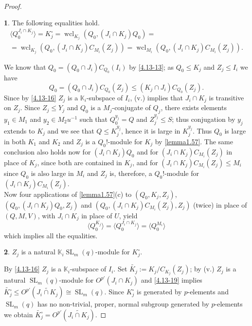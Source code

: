 \documentclass{amsart}
\numberwithin{equation}{section}
\theoremstyle{definition}
\theoremstyle{subresult}
\newtheorem{subresult}{}[equation]
\theoremstyle{caseresult}
\newcommand{\bK}{\mathbb{K}}
\newcommand{\SL}{\operatorname{SL}}
\newcommand{\wcl}{\operatorname{wcl}}
\newcommand{\inv}{^{-1}}
\newcommand{\<}{\langle}
\renewcommand{\>}{\rangle}
\begin{document}
\begin{proof}
	\begin{subresult}\label{4.13-19}
		The following equalities hold.
		\begin{multline*}
			\< Q_0^{J_i \cap K_j} \> = K_j^\circ = \wcl_{K_j}(Q_0,(J_i \cap K_j)Q_0) = \\
			= \wcl_{K_j}(Q_0,(J_i \cap K_j)C_{M_i}(Z_j)) = \wcl_{M_i}(Q_0,(J_i \cap K_j)C_{M_i}(Z_j)) .
		\end{multline*}
	\end{subresult}
	We know that $Q_0 = (Q_0 \cap J_i)C_{Q_0}(I_i)$ by \eqref{4.13-13}; as $Q_0 \le K_j$ and $Z_j \le I_i$ we have
	\[
	Q_0 = (Q_0 \cap J_i)C_{Q_0}(Z_j) \le (K_j \cap J_i)C_{Q_0}(Z_j).
	\]
	Since by \eqref{4.13-16} $Z_j$ is a $\bK_i$-subspace of $I_i$, (v.) implies that $J_i \cap K_j$ is transitive on $Z_j$. Since $Z_j \le Y_j$ and $Q_0$ is a $M_j$-conjugate of $Q_j$, there exists elements $y_1 \in M_1$ and $y_2 \in M_2u\inv$ such that $Q_0^{y_j}=Q$ and $Z_j^{y_j} \le S$; thus conjugation by $y_j$ extends to $K_j$ and we see that $Q \le K_j^{y_j}$, hence it is large in $K_j^{y_j}$. Thus $Q_0$ is large in both $K_1$ and $K_2$ and $Z_j$ is a $Q_0!$-module for $K_j$ by \ref{lemma1.57}. The same conclusion also holds now for $(J_i \cap K_j)Q_0$ and for $(J_i \cap K_j)C_{M_i}(Z_j)$ in place of $K_j$, since both are contained in $K_j$, and for $(J_i \cap K_j)C_{M_i}(Z_j) \le M_i$ since $Q_0$ is also large in $M_i$ and $Z_j$ is, therefore, a $Q_0!$-module for $(J_i \cap K_j)C_{M_i}(Z_j)$. \\
	Now four applications of \ref{lemma1.57}(c) to $(Q_0, K_j, Z_j)$, $(Q_0, (J_i \cap K_j)Q_0, Z_j)$ and $(Q_0, (J_i \cap K_j)C_{M_i}(Z_j), Z_j)$ (twice) in place of $(Q,M,V)$, with $J_i \cap K_j$ in place of $U$, yield
	\[
	\< Q_0^{K_j} \> = \<Q_0^{J_i \cap K_j} \> = \<Q_0^{M_i}\>
	\] which implies all the equalities.
	
	\begin{subresult}\label{4.13-20}
		$Z_j$ is a natural $\bK_i \SL_m(q)$-module for $K_j^\circ$.
	\end{subresult}
	By \eqref{4.13-16} $Z_j$ is a $\bK_i$-subspace of $I_i$. Set $\widetilde{K_j} := K_j / C_{K_j}(Z_j)$; by (v.) $Z_j$ is a natural $\SL_m(q)$-module for $O^{p'}(J_i \cap K_j)$ and \eqref{4.13-19} implies $\widetilde{K_j^\circ} \le O^{p'}(\widetilde{J_i \cap K_j}) \cong \SL_m(q)$. Since $K_j^\circ$ is generated by $p$-elements and $\SL_m(q)$ has no non-trivial, proper, normal subgroup generated by $p$-elements we obtain $\widetilde{K_j^\circ} = O^{p'}(\widetilde{J_i \cap K_j})$.
	

\end{proof}
\end{document}
